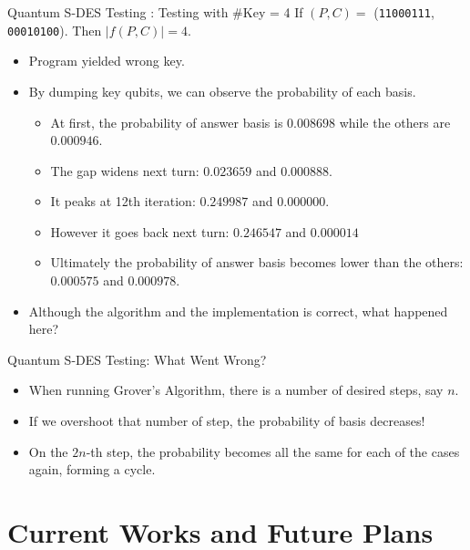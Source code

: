 \documentclass{beamer}
\begin{document}
    \begin{frame}{Quantum S-DES Testing : Testing with \#Key = 4}
        If $ (P, C) =$ (\texttt{11000111}, \texttt{00010100}). Then $ \vert f(P, C) \vert = 4$.
        \begin{itemize}
            \item Program yielded wrong key.
            \item By dumping key qubits, we can observe the probability of each basis.
            \begin{itemize}
                \item At first, the probability of answer basis is $ 0.008698 $ while the others are $ 0.000946 $.
                \item The gap widens next turn: $ 0.023659 $ and $ 0.000888 $.
                \item It peaks at 12th iteration: $ 0.249987 $ and $ 0.000000 $.
                \item However it goes back next turn: $ 0.246547 $ and $ 0.000014 $
                \item Ultimately the probability of answer basis becomes lower than the others: $ 0.000575 $ and $ 0.000978 $.
            \end{itemize}
            \item Although the algorithm and the implementation is correct, what happened here? %
        \end{itemize}
    \end{frame}

    \begin{frame}{Quantum S-DES Testing: What Went Wrong?}
        \begin{itemize}
            \item When running Grover's Algorithm, there is a number of desired steps, say $n$.
            \item If we overshoot that number of step, the probability of basis decreases!
            \item On the $2n$-th step, the probability becomes all the same for each of the cases again, forming a cycle.
        \end{itemize}
    \end{frame}


    \section{Current Works and Future Plans}
\end{document}
